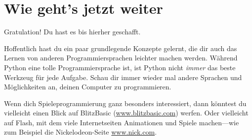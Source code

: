 

\chapter{Wie geht's jetzt weiter}

Gratulation! Du hast es bis hierher geschafft.
\par
\vspace{1em}
Hoffentlich hast du ein paar grundlegende Konzepte gelernt, die dir auch das Lernen von anderen Programmiersprachen leichter machen werden. Während Python eine tolle Programmiersprache ist, ist Python nicht \emph{immer} das beste Werkzeug für jede Aufgabe. Schau dir immer wieder mal andere Sprachen und Möglichkeiten an, deinen Computer zu programmieren.

\vspace{1em}
Wenn dich Spieleprogrammierung ganz besonders interessiert, dann könntest du vielleicht einen Blick auf BlitzBasic (\href{http://www.blitzbasic.com}{www.blitzbasic.com}) werfen. Oder vielleicht auf Flash, mit dem viele Internetseiten Animationen und Spiele machen---wie zum Beispiel die Nickelodeon-Seite \href{http://www.nick.com}{www.nick.com}.

